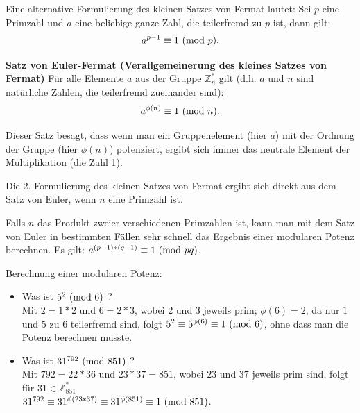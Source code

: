 \begin{refsegment}
Eine alternative Formulierung des kleinen Satzes von Fermat lautet:
Sei $p$ eine Primzahl und $a$ eine beliebige ganze Zahl, die
teilerfremd zu $p$ ist, dann gilt:
$$a^{p-1} \equiv 1 {\rm ~(mod~} p).$$
\begin{satz}{\label{thm-zth-fermateuler}}
\textbf{Satz von Euler-Fermat (Verallgemeinerung des kleines Satzes
von Fermat)}\hypertarget{Euler-Fermat}{}
Für alle Elemente $a$ aus der Gruppe $\mathbb{Z}_n^*$ gilt (d.h. $a$
und $n$ sind natürliche Zahlen, die teilerfremd zueinander sind):
$$  a^{\phi(n)} \equiv 1  {\rm ~(mod~} n).$$
\end{satz}
 

Dieser Satz besagt, dass wenn man ein Gruppenelement (hier $a$) mit der
Ordnung der Gruppe (hier $\phi(n)$) potenziert,
ergibt sich immer das neutrale Element der Multiplikation (die Zahl 1).

Die 2. Formulierung des kleinen Satzes von Fermat ergibt sich direkt
aus dem Satz von Euler, wenn $n$ eine Primzahl ist.

Falls $n$ das Produkt zweier verschiedenen Primzahlen ist, kann man mit
dem Satz von Euler in bestimmten Fällen sehr schnell das Ergebnis einer
modularen Potenz berechnen.
Es gilt: $a^{(p-1)*(q-1)} \equiv 1 {\rm ~(mod~}pq)$.

\begin{example}{ Berechnung einer modularen Potenz:}
\begin{itemize}[nosep]
   \item Was ist $5^{2} {\rm ~(mod~}6)$ ?\\
         Mit $2 = 1 * 2$ und $6 = 2*3$, wobei $2$ und $3$ jeweils prim;
         $\phi(6) = 2$, da nur $1$ und $5$ zu $6$ teilerfremd
          sind, folgt
         $5^2 \equiv 5^{\phi(6)} \equiv 1 {\rm ~(mod~}6)$,
         ohne dass man die Potenz berechnen musste.
   \item Was ist $31^{792} {\rm ~(mod~}851)$ ?\\
         Mit $792 = 22 * 36$ und $23*37 = 851$, wobei $23$ und $37$ jeweils
         prim sind, folgt für $31 \in \mathbb{Z}_{851}^*$\\
         $31^{792} \equiv 31^{\phi(23*37)} \equiv 31^{\phi(851)} \equiv 1
         {\rm ~(mod~}851)$.
\end{itemize}
\end{example}


\end{refsegment}
